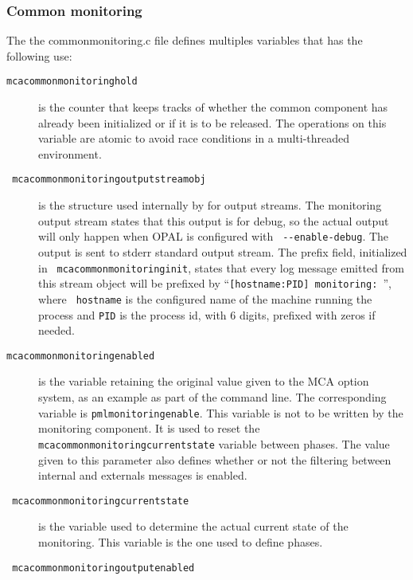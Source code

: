 \subsubsection{Common monitoring}
\label{subsubsec:TDI-common-monitoring}

The the common\brkunds{}monitoring.c file defines multiples variables
that has the following use:
\begin{description}
\item[{\tt mca\brkunds{}common\brkunds{}monitoring\brkunds{}hold}] is
  the counter that keeps tracks of whether the common component has
  already been initialized or if it is to be released. The operations
  on this variable are atomic to avoid race conditions in a
  multi-threaded environment.
\item[{\tt
    mca\brkunds{}common\brkunds{}monitoring\brkunds{}output\brkunds{}stream\brkunds{}obj}]
  is the structure used internally by \ompi{} for output streams. The
  monitoring output stream states that this output is for debug, so
  the actual output will only happen when OPAL is configured with {\tt
    -{}-enable-debug}. The output is sent to stderr standard output
  stream. The prefix field, initialized in {\tt
    mca\brkunds{}common\brkunds{}monitoring\brkunds{}init}, states
  that every log message emitted from this stream object will be
  prefixed by ``{\tt [hostname:PID] monitoring: }'', where {\tt
    hostname} is the configured name of the machine running the
  process and {\tt PID} is the process id, with 6 digits, prefixed
  with zeros if needed.
\item[{\tt mca\brkunds{}common\brkunds{}monitoring\brkunds{}enabled}]
  is the variable retaining the original value given to the MCA option
  system, as an example as part of the command line. The corresponding
  variable is {\tt pml\brkunds{}monitoring\brkunds{}enable}. This
  variable is not to be written by the monitoring component. It is
  used to reset the {\tt
    mca\brkunds{}common\brkunds{}monitoring\brkunds{}current\brkunds{}state}
  variable between phases. The value given to this parameter also
  defines whether or not the filtering between internal and externals
  messages is enabled.
\item[{\tt
    mca\brkunds{}common\brkunds{}monitoring\brkunds{}current\brkunds{}state}]
  is the variable used to determine the actual current state of the
  monitoring. This variable is the one used to define phases.
\item[{\tt
    mca\brkunds{}common\brkunds{}monitoring\brkunds{}output\brkunds{}enabled}]

\end{description}
